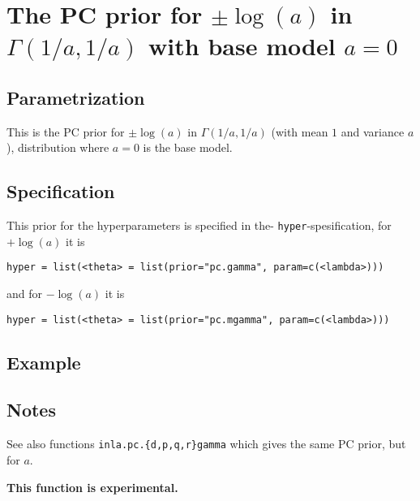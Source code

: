 \documentclass[a4paper,11pt]{article}
\begin{document}
\section*{The PC prior for $\pm\log(a)$ in $\Gamma(1/a,1/a)$ with base model $a=0$}

\subsection*{Parametrization}
This is the PC prior for $\pm\log(a)$ in $\Gamma(1/a,1/a)$ (with mean
$1$ and variance $a$), distribution where $a=0$ is the base model.

\subsection*{Specification}
This prior for the hyperparameters is specified in the-
\texttt{hyper}-spesification, for $+\log(a)$ it is
\begin{center}
    \texttt{hyper = list(<theta> = list(prior="pc.gamma", param=c(<lambda>)))}
\end{center}
and for $-\log(a)$ it is
\begin{center}
    \texttt{hyper = list(<theta> = list(prior="pc.mgamma", param=c(<lambda>)))}
\end{center}

\subsection*{Example}

\subsection*{Notes}
See also functions \texttt{inla.pc.\{d,p,q,r\}gamma} which gives the
same PC prior, but for $a$.

\noindent\textbf{This function is experimental.}
\end{document}
